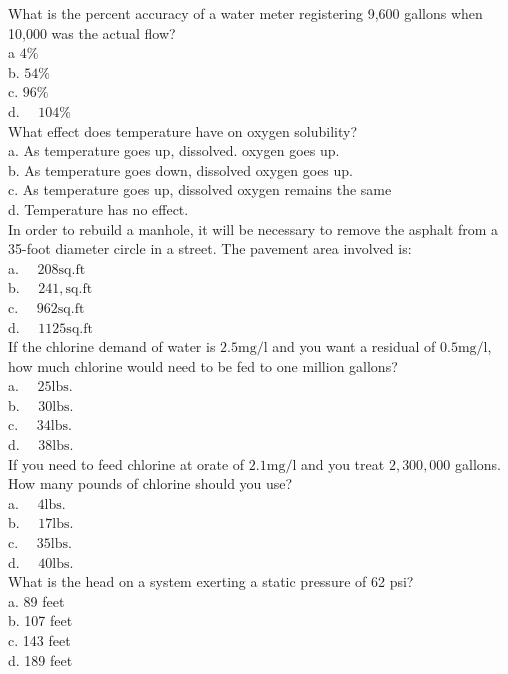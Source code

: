 What is the percent accuracy of a water meter registering 9,600 gallons when 10,000 was the actual flow?\\
a $4 \%$\\
b. $54 \%$\\
c. $96 \%$\\
d. $\quad 104 \%$ \\

What effect does temperature have on oxygen solubility?\\
a. As temperature goes up, dissolved. oxygen goes up.\\
b. As temperature goes down, dissolved oxygen goes up.\\
c. As temperature goes up, dissolved oxygen remains the same\\
d. Temperature has no effect.\\

In order to rebuild a manhole, it will be necessary to remove the asphalt from a 35-foot diameter circle in a street. The pavement area involved is:\\
a. $\quad 208 \mathrm{sq. ft}$\\
b. $\quad 241, \mathrm{sq. ft}$\\
c. $\quad 962 \mathrm{sq. ft}$\\
d. $\quad 1125 \mathrm{sq. ft}$\\

If the chlorine demand of water is $2.5 \mathrm{mg} / \mathrm{l}$ and you want a residual of $0.5 \mathrm{mg} / \mathrm{l}$, how much chlorine would need to be fed to one million gallons?\\
a. $\quad 25 \mathrm{lbs}$.\\
b. $\quad 30 \mathrm{lbs}$.\\
c. $\quad 34 \mathrm{lbs}$.\\
d. $\quad 38 \mathrm{lbs}$.\\

If you need to feed chlorine at orate of $2.1 \mathrm{mg} / \mathrm{l}$ and you treat $2,300,000$ gallons. How many pounds of chlorine should you use?\\
a. $\quad 4 \mathrm{lbs}$.\\
b. $\quad 17 \mathrm{lbs}$.\\
c. $\quad 35 \mathrm{lbs}$.\\
d. $\quad 40 \mathrm{lbs}$.\\

What is the head on a system exerting a static pressure of 62 psi?\\
a. 89 feet\\
b. 107 feet\\
c. 143 feet\\
d. 189 feet \\

